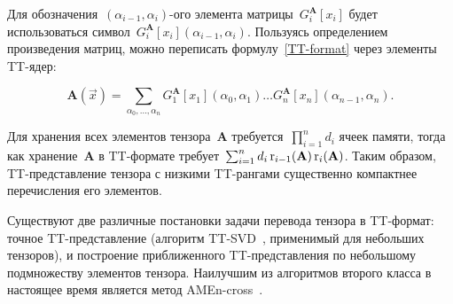 Для обозначения~$(\alpha_{i-1}, \alpha_{i})$-ого элемента матрицы~$G_i^{\mathbf{A}}[x_i]$ будет использоваться символ~$G_i^{\mathbf{A}}[x_i](\alpha_{i-1}, \alpha_{i})$.
Пользуясь определением произведения матриц, можно переписать формулу~\eqref{TT-format} через элементы TT\hyp{}ядер:

\begin{equation}
	\label{TT-format-sum}
	\mathbf{A}(\vec{x}) =
	\sum_{\alpha_0, \ldots, \alpha_n} G^{\mathbf{A}}_1[x_1](\alpha_0, \alpha_1) \ldots G^{\mathbf{A}}_n[x_n](\alpha_{n-1}, \alpha_n).
\end{equation}

Для хранения всех элементов тензора~$\mathbf{A}$ требуется~$\prod_{i=1}^n d_i$ ячеек памяти, тогда как хранение~$\mathbf{A}$ в TT\hyp{}формате требует~$\sum_{i=1}^n d_i \operatorname{r}_{i-1}(\mathbf{A}) \operatorname{r}_{i}(\mathbf{A})$. Таким образом, TT\hyp{}представление тензора с низкими TT\hyp{}рангами существенно компактнее перечисления его элементов.

Существуют две различные постановки задачи перевода тензора в TT\hyp{}формат: точное TT\hyp{}представление (алгоритм TT-SVD~\cite{oseledets2011ttMain}, применимый для небольших тензоров), и построение приближенного TT\hyp{}представления по небольшому подмножеству элементов тензора. Наилучшим из алгоритмов второго класса в настоящее время является метод AMEn-cross~\cite{dolgov2013amenCross}.

